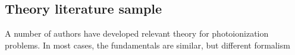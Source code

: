 \subsection{Theory literature sample\label{sec:theory-lit}}

A number of authors have developed relevant theory for photoionization problems. In most cases, the fundamentals are similar, but different formalism